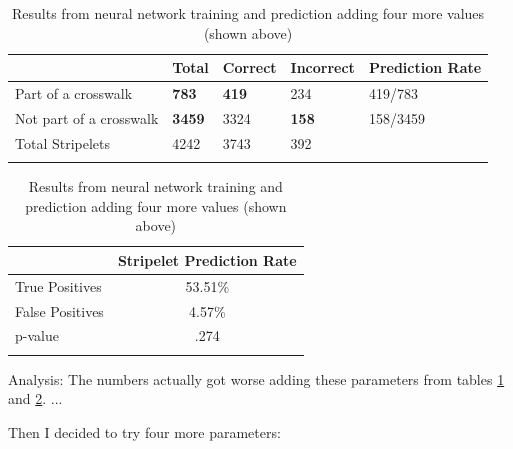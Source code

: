 \documentclass[12pt]{ucthesis}
\begin{document}
{\begin{center}
    \begin{longtable}{| l | l | l | l | l |}
    \hline
     & Total & Correct & Incorrect & Prediction Rate \\ \hline
    Part of a crosswalk & \textbf{783} & \textbf{419} & 234 & 419/783 \\ \hline
    Not part of a crosswalk & \textbf{3459} & 3324 & \textbf{158} & 158/3459\\ \hline
    Total Stripelets & 4242 & 3743 & 392 & \\ \hline
    
    \caption{Results from neural network training and prediction adding four more values (shown above)}
    \label{tab:Results2-1} 
    \end{longtable}
\end{center}


\begin{longtable}{| l | c |}
  \hline
   & Stripelet Prediction Rate \\ \hline                   
  True Positives & 53.51\%  \\ \hline
  False Positives & 4.57\% \\ \hline
  p-value & .274  \\ \hline
\caption{Results from neural network training and prediction adding four more values (shown above)}
\label{tab:Results2-2} 
\end{longtable}

Analysis: The numbers actually got worse adding these parameters from tables \ref{tab:Results2-1} and \ref{tab:Results2-2}.  ...

Then I decided to try four more parameters:

}
\end{document}
